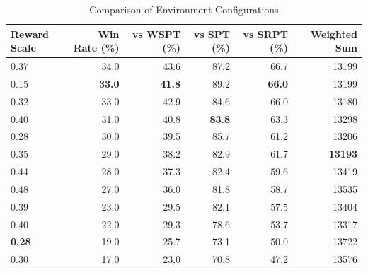\begin{table}[htbp]%
\centering%
\begin{tabular}{lrrrrr}%
\toprule%
\textbf{Reward Scale}&\textbf{Win Rate (\%)}&\textbf{vs WSPT (\%)}&\textbf{vs SPT (\%)}&\textbf{vs SRPT (\%)}&\textbf{Weighted Sum}\\%
\midrule%
0.37&34.0&43.6&87.2&66.7&13199\\%
0.15&\textbf{33.0}&\textbf{41.8}&89.2&\textbf{66.0}&13199\\%
0.32&33.0&42.9&84.6&66.0&13180\\%
0.40&31.0&40.8&\textbf{83.8}&63.3&13298\\%
0.28&30.0&39.5&85.7&61.2&13206\\%
0.35&29.0&38.2&82.9&61.7&\textbf{13193}\\%
0.44&28.0&37.3&82.4&59.6&13419\\%
0.48&27.0&36.0&81.8&58.7&13535\\%
0.39&23.0&29.5&82.1&57.5&13404\\%
0.40&22.0&29.3&78.6&53.7&13317\\%
\textbf{0.28}&19.0&25.7&73.1&50.0&13722\\%
0.30&17.0&23.0&70.8&47.2&13576\\%
\bottomrule%
\end{tabular}%
\caption{Comparison of Environment Configurations}%
\label{tab:environment}%
\end{table}